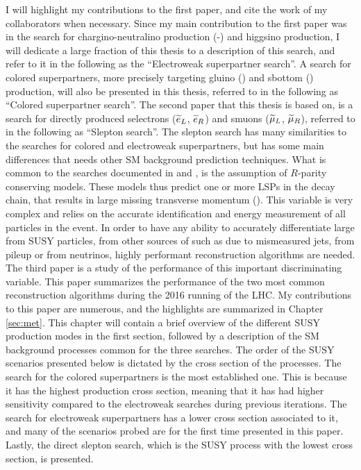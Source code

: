 I will highlight my contributions to the first paper, and cite the work of my collaborators when necessary. 
Since my main contribution to the first paper was in the search for chargino-neutralino production (\firstcharg-\secondchi) and higgsino production, I will dedicate a large fraction of this thesis to a description of this search, and refer to it in the following as the ``Electroweak superpartner search''.
A search for colored superpartners, more precisely targeting gluino (\gluino) and sbottom (\sbottom) production, will also be presented in this thesis, referred to in the following as ``Colored superpartner search''.
The second paper that this thesis is based on, is a search for directly produced selectrons ($\widetilde{e}_{L}$, $\widetilde{e}_{R}$) and smuons ($\widetilde{\mu}_{L}$, $\widetilde{\mu}_{R}$), referred to in the following as ``Slepton search''. 
The slepton search has many similarities to the searches for colored and electroweak superpartners, but has some main differences that needs other SM background prediction techniques. 
What is common to the searches documented in \cite{Sirunyan:2017qaj} and \cite{Sirunyan:2018nwe}, is the assumption of $R$-parity conserving models. 
These models thus predict one or more LSPs in the decay chain, that results in large missing transverse momentum (\ptmiss). 
This variable is very complex and relies on the accurate identification and energy measurement of all particles in the event. 
In order to have any ability to accurately differentiate large \ptmiss from SUSY particles, from other sources of \ptmiss such as due to mismeasured jets, from pileup or from neutrinos, highly performant \ptmiss reconstruction algorithms are needed. 
The third paper \cite{Sirunyan:2019kia} is a study of the performance of this important discriminating variable. 
This paper summarizes the performance of the two most common \ptmiss reconstruction algorithms during the 2016 running of the LHC. 
My contributions to this paper are numerous, and the highlights are summarized in Chapter \ref{sec:met}. 
\newpara
\noindent\justify
This chapter will contain a brief overview of the different SUSY production modes in the first section, followed by a description of the SM background processes common for the three searches. 
The order of the SUSY scenarios presented below is dictated by the cross section of the processes. 
The search for the colored superpartners is the most established one. 
This is because it has the highest production cross section, meaning that it has had higher sensitivity compared to the electroweak searches during previous iterations. 
The search for electroweak superpartners has a lower cross section associated to it, and many of the scenarios probed are for the first time presented in this paper. 
Lastly, the direct slepton search, which is the SUSY process with the lowest cross section, is presented. 
